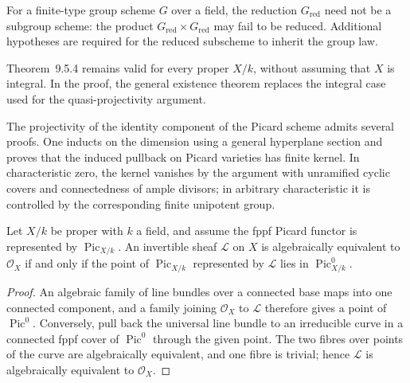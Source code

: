 \begin{remark}\label{fga-rem-9-5-2}\uses{}
For a finite-type group scheme $G$ over a field, the reduction $G_{\mathrm{red}}$
need not be a subgroup scheme: the product $G_{\mathrm{red}}\times G_{\mathrm{red}}$
may fail to be reduced.  Additional hypotheses are required for the reduced
subscheme to inherit the group law.
\end{remark}

\begin{remark}\label{fga-rem-9-5-6}
Theorem~9.5.4 remains valid for every proper $X/k$, without assuming that $X$
is integral.  In the proof, the general existence theorem replaces the integral
case used for the quasi-projectivity argument.
\end{remark}

\begin{remark}\label{fga-rem-9-5-8}
The projectivity of the identity component of the Picard scheme admits several
proofs.  One inducts on the dimension using a general hyperplane section and
proves that the induced pullback on Picard varieties has finite kernel.  In
characteristic zero, the kernel vanishes by the argument with unramified cyclic
covers and connectedness of ample divisors; in arbitrary characteristic it is
controlled by the corresponding finite unipotent group.
\end{remark}

\begin{proposition}\label{fga-pro-9-5-10}
Let $X/k$ be proper with $k$ a field, and assume the fppf Picard functor is
represented by $\operatorname{Pic}_{X/k}$.  An invertible sheaf $\mathcal L$ on
$X$ is algebraically equivalent to $\mathcal O_X$ if and only if the point of
$\operatorname{Pic}_{X/k}$ represented by $\mathcal L$ lies in
$\operatorname{Pic}^0_{X/k}$.
\end{proposition}
\begin{proof}
An algebraic family of line bundles over a connected base maps into one
connected component, and a family joining $\mathcal O_X$ to $\mathcal L$
therefore gives a point of $\operatorname{Pic}^0$.  Conversely, pull back the
universal line bundle to an irreducible curve in a connected fppf cover of
$\operatorname{Pic}^0$ through the given point.  The two fibres over points of
the curve are algebraically equivalent, and one fibre is trivial; hence
$\mathcal L$ is algebraically equivalent to $\mathcal O_X$.
\end{proof}

